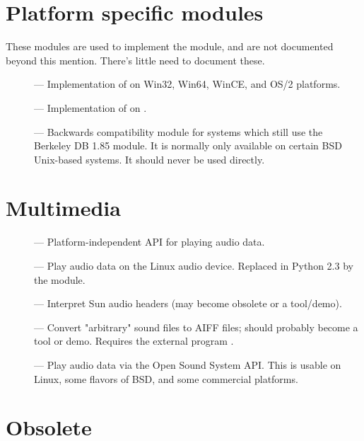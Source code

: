 \section{Platform specific modules}

These modules are used to implement the  module,
and are not documented beyond this mention.  There's little need to
document these.

\begin{description}
\item[]
--- Implementation of  on Win32, Win64, WinCE, and
OS/2 platforms.

\item[]
--- Implementation of  on \POSIX.

\item[]
--- Backwards compatibility module for systems which still use the Berkeley
DB 1.85 module.  It is normally only available on certain BSD Unix-based
systems.  It should never be used directly.
\end{description}


\section{Multimedia}

\begin{description}
\item[]
--- Platform-independent API for playing audio data.

\item[]
--- Play audio data on the Linux audio device.  Replaced in Python 2.3
by the  module.

\item[]
--- Interpret Sun audio headers (may become obsolete or a tool/demo).

\item[]
--- Convert "arbitrary" sound files to AIFF files; should probably
become a tool or demo.  Requires the external program .

\item[]
--- Play audio data via the Open Sound System API.  This is usable on
Linux, some flavors of BSD, and some commercial \UNIX{} platforms.
\end{description}


\section{Obsolete \label{obsolete-modules}}


